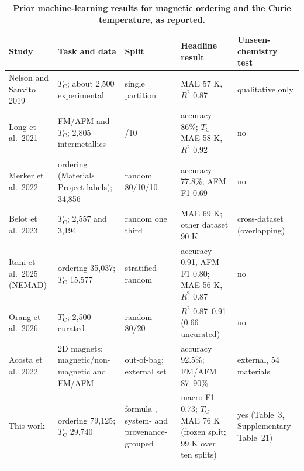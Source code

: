 \documentclass[pdflatex,sn-nature]{sn-jnl}
\newcommand{\Tc}{\ensuremath{T_\mathrm{C}}}
\begin{document}
\begin{table}[!ht]
\caption{\textbf{Prior machine-learning results for magnetic ordering and the Curie temperature, as reported.}}\label{tab:s9}%
\setlength{\tabcolsep}{4pt}%
\begin{tabular}{@{}>{\raggedright\arraybackslash}p{62pt}>{\raggedright\arraybackslash}p{78pt}>{\raggedright\arraybackslash}p{56pt}>{\raggedright\arraybackslash}p{92pt}>{\raggedright\arraybackslash}p{52pt}@{}}
\toprule
Study & Task and data & Split & Headline result & Unseen-chemistry test \\
\midrule
Nelson and Sanvito 2019\cite{nelson2019curie} & \Tc{}; about 2,500 experimental & single partition & MAE 57 K, $R^2$ 0.87 & qualitative only \\[2pt]
Long et al.\ 2021\cite{long2021ferro} & FM/AFM and \Tc{}; 2,805 intermetallics & 90/10 & accuracy 86\%; \Tc{} MAE 58 K, $R^2$ 0.92 & no \\[2pt]
Merker et al.\ 2022\cite{merker2022classifiers} & ordering (Materials Project labels); 34,856 & random 80/10/10 & accuracy 77.8\%; AFM F1 0.69 & no \\[2pt]
Belot et al.\ 2023\cite{belot2023curie} & \Tc{}; 2,557 and 3,194 & random one third & MAE 69 K; other dataset 90 K & cross-dataset (overlapping) \\[2pt]
Itani et al.\ 2025 (NEMAD)\cite{itani2025nemad} & ordering 35,037; \Tc{} 15,577 & stratified random & accuracy 0.91, AFM F1 0.80; MAE 56 K, $R^2$ 0.87 & no \\[2pt]
Orang et al.\ 2026\cite{abediorang2026curie} & \Tc{}; 2,500 curated & random 80/20 & $R^2$ 0.87--0.91 (0.66 uncurated) & no \\[2pt]
Acosta et al.\ 2022\cite{acosta2022ordering2d} & 2D magnets; magnetic/non-magnetic and FM/AFM & out-of-bag; external set & accuracy 92.5\%; FM/AFM 87--90\% & external, 54 materials \\[2pt]
This work & ordering 79,125; \Tc{} 29,740 & formula-, system- and provenance-grouped & macro-F1 0.73; \Tc{} MAE 76 K (frozen split; 99 K over ten splits) & yes (Table~3, Supplementary Table~21) \\
\botrule
\end{tabular}
\end{table}
\end{document}
